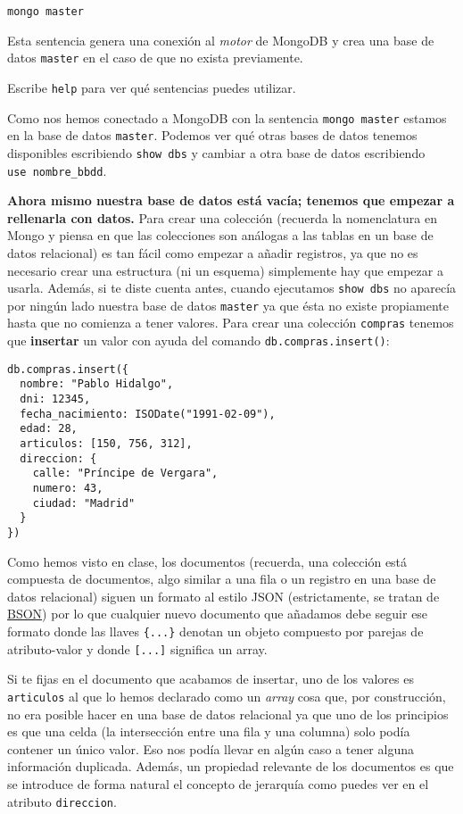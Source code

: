 \documentclass[]{article}
\begin{document}
\begin{verbatim}
mongo master
\end{verbatim}

Esta sentencia genera una conexión al \emph{motor} de MongoDB y crea una
base de datos \texttt{master} en el caso de que no exista previamente.

Escribe \texttt{help} para ver qué sentencias puedes utilizar.

Como nos hemos conectado a MongoDB con la sentencia
\texttt{mongo\ master} estamos en la base de datos \texttt{master}.
Podemos ver qué otras bases de datos tenemos disponibles escribiendo
\texttt{show\ dbs} y cambiar a otra base de datos escribiendo
\texttt{use\ nombre\_bbdd}.

\textbf{Ahora mismo nuestra base de datos está vacía; tenemos que
empezar a rellenarla con datos.} Para crear una colección (recuerda la
nomenclatura en Mongo y piensa en que las colecciones son análogas a las
tablas en un base de datos relacional) es tan fácil como empezar a
añadir registros, ya que no es necesario crear una estructura (ni un
esquema) simplemente hay que empezar a usarla. Además, si te diste
cuenta antes, cuando ejecutamos \texttt{show\ dbs} no aparecía por
ningún lado nuestra base de datos \texttt{master} ya que ésta no existe
propiamente hasta que no comienza a tener valores. Para crear una
colección \texttt{compras} tenemos que \textbf{insertar} un valor con
ayuda del comando \texttt{db.compras.insert()}:

\begin{verbatim}
db.compras.insert({
  nombre: "Pablo Hidalgo",
  dni: 12345,
  fecha_nacimiento: ISODate("1991-02-09"),
  edad: 28,
  articulos: [150, 756, 312],
  direccion: {
    calle: "Príncipe de Vergara",
    numero: 43,
    ciudad: "Madrid"
  }
})
\end{verbatim}

Como hemos visto en clase, los documentos (recuerda, una colección está
compuesta de documentos, algo similar a una fila o un registro en una
base de datos relacional) siguen un formato al estilo JSON
(estrictamente, se tratan de
\href{https://en.wikipedia.org/wiki/BSON}{BSON}) por lo que cualquier
nuevo documento que añadamos debe seguir ese formato donde las llaves
\texttt{\{...\}} denotan un objeto compuesto por parejas de
atributo-valor y donde \texttt{{[}...{]}} significa un array.

Si te fijas en el documento que acabamos de insertar, uno de los valores
es \texttt{articulos} al que lo hemos declarado como un \emph{array}
cosa que, por construcción, no era posible hacer en una base de datos
relacional ya que uno de los principios es que una celda (la
intersección entre una fila y una columna) solo podía contener un único
valor. Eso nos podía llevar en algún caso a tener alguna información
duplicada. Además, un propiedad relevante de los documentos es que se
introduce de forma natural el concepto de jerarquía como puedes ver en
el atributo \texttt{direccion}.
\end{document}
